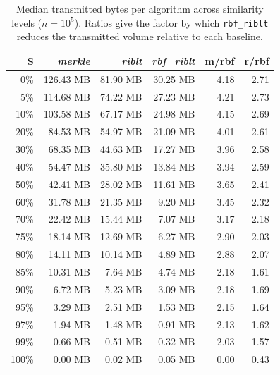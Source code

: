 \begin{table}[!htbp]
  \centering
  \caption{Median transmitted bytes per algorithm across similarity levels
  ($n{=}10^5$). Ratios give the factor by which \texttt{rbf\_riblt} reduces
  the transmitted volume relative to each baseline.}
  \label{tab:transmitted_bytes_by_similarity}
  \begin{tabular}{rrrrrr}
  \toprule
  S & \textit{merkle} & \textit{riblt} & \textit{rbf\_riblt} & m/rbf & r/rbf \\
  \midrule
  0\% & 126.43 MB & 81.90 MB & 30.25 MB & 4.18 & 2.71 \\
  5\% & 114.68 MB & 74.22 MB & 27.23 MB & 4.21 & 2.73 \\
  10\% & 103.58 MB & 67.17 MB & 24.98 MB & 4.15 & 2.69 \\
  20\% & 84.53 MB & 54.97 MB & 21.09 MB & 4.01 & 2.61 \\
  30\% & 68.35 MB & 44.63 MB & 17.27 MB & 3.96 & 2.58 \\
  40\% & 54.47 MB & 35.80 MB & 13.84 MB & 3.94 & 2.59 \\
  50\% & 42.41 MB & 28.02 MB & 11.61 MB & 3.65 & 2.41 \\
  60\% & 31.78 MB & 21.35 MB & 9.20 MB & 3.45 & 2.32 \\
  70\% & 22.42 MB & 15.44 MB & 7.07 MB & 3.17 & 2.18 \\
  75\% & 18.14 MB & 12.69 MB & 6.27 MB & 2.90 & 2.03 \\
  80\% & 14.11 MB & 10.14 MB & 4.89 MB & 2.88 & 2.07 \\
  85\% & 10.31 MB & 7.64 MB & 4.74 MB & 2.18 & 1.61 \\
  90\% & 6.72 MB & 5.23 MB & 3.09 MB & 2.18 & 1.69 \\
  95\% & 3.29 MB & 2.51 MB & 1.53 MB & 2.15 & 1.64 \\
  97\% & 1.94 MB & 1.48 MB & 0.91 MB & 2.13 & 1.62 \\
  99\% & 0.66 MB & 0.51 MB & 0.32 MB & 2.03 & 1.57 \\
  100\% & 0.00 MB & 0.02 MB & 0.05 MB & 0.00 & 0.43 \\
  \bottomrule
  \end{tabular}
\end{table}
